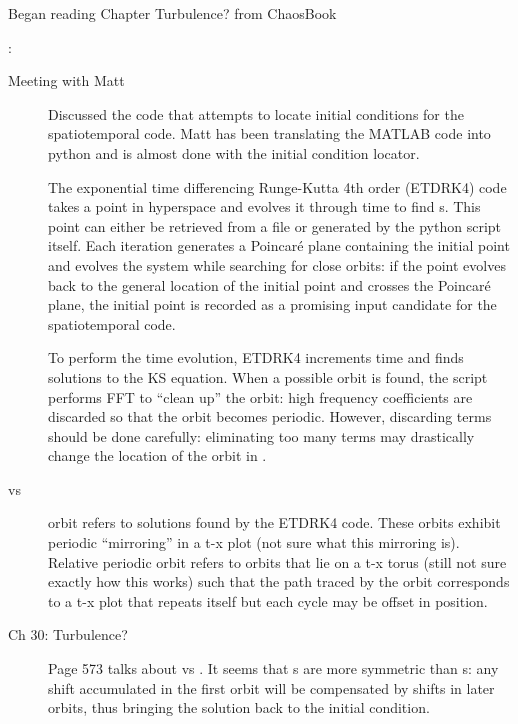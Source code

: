 \begin{description}
{
Began reading Chapter
   {Turbulence?} from ChaosBook
}

{ :
\begin{description}
\item[Meeting with Matt]
Discussed the code that attempts to locate initial
conditions for the spatiotemporal code. Matt has been translating the MATLAB
code into python and is almost done with the initial condition locator.

The exponential time differencing Runge-Kutta 4th order (ETDRK4) code takes a
point in hyperspace and evolves it through time to find {\ppo}s.
This point can either be retrieved from a file or generated by the python
script itself. Each iteration generates a Poincar\'e plane containing the
initial point and evolves the system while searching for close orbits: if the
point evolves back to the general location of the initial point and crosses
the Poincar\'e plane, the initial point is recorded as a promising input
candidate for the spatiotemporal code.

To perform the time evolution, ETDRK4 increments time and finds solutions to
the KS equation. When a possible orbit is found, the script performs FFT to
``clean up'' the orbit: high frequency coefficients are discarded so that the
orbit becomes periodic. However, discarding terms should be done carefully:
eliminating too many terms may drastically change the location of the orbit in
{\statesp}.

\item[{\Ppo} vs {\rpo}]
{\Ppo} orbit refers to solutions found by the ETDRK4
code. These orbits exhibit periodic ``mirroring'' in a t-x plot (not sure what
this mirroring is). Relative periodic orbit refers to orbits that lie on a t-x
torus (still not sure exactly how this works) such that the path traced by the
orbit corresponds to a t-x plot that repeats itself but each cycle may be
offset in position.

\item[Ch 30: Turbulence?]
Page 573 talks about {\rpo} vs {\ppo}. It seems that
{\ppo}s are more symmetric than {\rpo}s: any shift accumulated in the first orbit
will be compensated by shifts in later orbits, thus bringing the solution back
to the initial condition.
\end{description}
}


\end{description}
